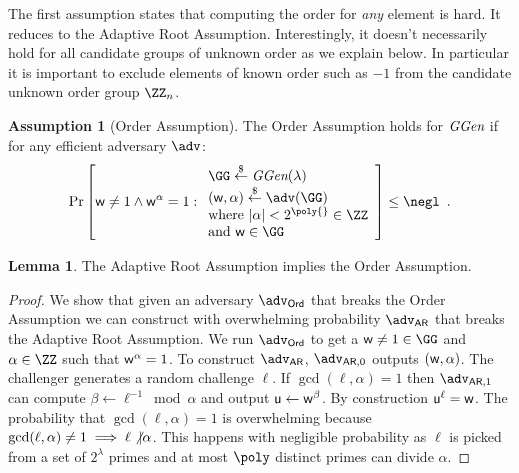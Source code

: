 \documentclass{article}
\theoremstyle{definition}
\newtheorem{lemma}{Lemma}
\newtheorem{assumption}{Assumption}
\newcommand{\benedikt}[1]{{\textcolor{red}{[Benedikt: #1]}}}
\newcommand{\benedikt}[1]{}
\begin{document}
The first assumption states that computing the order for \emph{any} element is hard. It reduces to the Adaptive Root Assumption. Interestingly, it doesn't necessarily hold for all candidate groups of unknown order as we explain below. In particular it is important to exclude elements of known order such as $-1$ from the candidate unknown order group $\ZZ_n$.
\begin{assumption}[Order Assumption]
\label{assum:order}
	The Order Assumption holds for $\textit{GGen}$ if for any efficient adversary $\adv$:
\[        
                \Pr\left[\gr{w}\neq 1 \wedge \gr{w}^{\alpha}= 1: 
                \begin{array}{l} 
                      \GG \sample \ggen(\lambda) \\ 
                      (\gr{w},\alpha) \sample \adv(\GG) \\
                      \text{where } |\alpha|<2^{\poly{}}\in \ZZ\\
                      \text{and } \gr{w}\in \GG
                \end{array} 
        \right] \leq \negl \enspace .
\]
\end{assumption}
\begin{lemma}
\label{lem:ordertoadaptive}
	The Adaptive Root Assumption implies the Order Assumption.
\end{lemma}
\begin{proof}
	We show that given an adversary $\adv_{\textsf{Ord}}$ that breaks the Order Assumption we can construct with overwhelming probability $\adv_{\textsf{AR}}$ that breaks the Adaptive Root Assumption. We run $\adv_{\textsf{Ord}}$ to get a $\gr{w}\neq 1\in \GG$ and $\alpha \in \ZZ$ such that $\mathsf{w}^{\alpha}=1$. To construct $\adv_{\textsf{AR}}$, $\adv_{\textsf{AR},0}$ outputs $(\mathsf{w},\alpha)$. The challenger generates a random challenge $\ell$. If $\gcd(\ell,\alpha)=1$ then $\adv_{\textsf{AR},1}$ can compute $\beta\gets \ell^{-1} \bmod \alpha$ and output $\mathsf{u}\gets\mathsf{w}^{\beta}$. By construction $\mathsf{u}^{\ell}=\mathsf{w}$. The probability that $\gcd(\ell,\alpha)=1$ is overwhelming because $\gcd(\ell,\alpha)\neq 1 \implies \ell \not\vert \alpha$. This happens with negligible probability as $\ell$ is picked from a set of $2^\lambda$ primes and at most $\poly$ distinct primes can divide $\alpha$.
	\end{proof}
	
\end{document}

